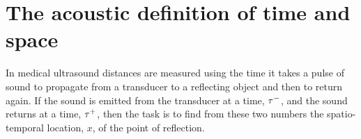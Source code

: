 









\section{The acoustic definition of time and space}\label{sec:measurement}


In medical ultrasound distances are measured using the time it takes a pulse of sound to propagate from a transducer
to a reflecting object and then to return again. 
If the sound is emitted from the transducer at a time, $\tau^-$,
and the sound returns at a time,  $\tau^+$,
then the task is to find from these two numbers the spatio-temporal location, $x$,
of the point of reflection.

